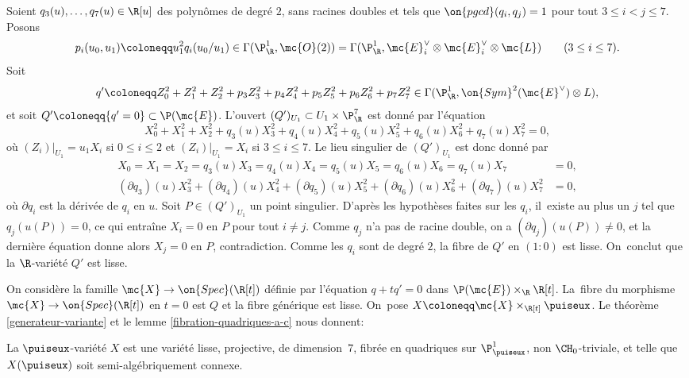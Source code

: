 Soient $q_3(u),\dots,q_7(u)\in \R[u]$ des polynômes de degré $2$, sans racines doubles et tels que $\on{pgcd}(q_i,q_j)=1$ pour tout $3\leq i<j\leq 7$. Posons
\[p_i(u_0,u_1)\coloneqq u_1^2q_i(u_0/u_1)\in \Gamma(\P^1_\R,\mc{O}(2))=\Gamma(\P^1_\R,\mc{E}_i^\vee\otimes \mc{E}_i^\vee\otimes \mc{L})\qquad (3\leq i\leq 7).\]
Soit
\[q'\coloneqq Z_0^2+Z_1^2+Z_2^2+p_3Z_3^2+p_4Z_4^2+p_5Z_5^2+p_6Z_6^2+p_7Z_7^2\in \Gamma(\P^1_\R, \on{Sym}^2(\mc{E}^\vee)\otimes L),\]
et soit $Q'\coloneqq \{q'=0\}\subset \P(\mc{E})$. L'ouvert $(Q')_{U_1}\subset U_1\times \P^7_\R$ est donné par l'équation
\[X_0^2+X_1^2+X_2^2+q_3(u)X_3^2+q_4(u)X_4^2+q_5(u)X_5^2+q_6(u)X_6^2+q_7(u)X_7^2=0,\]
où $(Z_i)|_{U_1}=u_1X_i$ si $0\leq i\leq 2$ et $(Z_i)|_{U_1}=X_i$ si $3\leq i\leq 7$.
Le lieu singulier de $(Q')_{U_1}$ est donc donné par
\begin{align*}
X_0=X_1=X_2=q_3(u)X_3=q_4(u)X_4=q_5(u)X_5=q_6(u)X_6=q_7(u)X_7&=0,\\
(\partial q_3)(u)X_3^2+(\partial q_4)(u)X_4^2+(\partial q_5)(u)X_5^2+(\partial q_6)(u)X_6^2+(\partial q_7)(u)X_7^2&=0,
\end{align*}
où $\partial q_i$ est la dérivée de $q_i$ en $u$. Soit $P\in (Q')_{U_1}$ un point singulier. D'après les hypothèses faites sur les $q_i$, il~existe au plus un $j$ tel que $q_j(u(P))=0$, ce qui entraîne $X_i=0$ en $P$ pour tout $i\neq j$. Comme $q_j$ n'a pas de racine double, on a $(\partial q_j)(u(P))\neq 0$, et la dernière équation donne alors $X_j=0$ en $P$, contradiction. Comme les $q_i$ sont de degré $2$, la fibre de $Q'$ en $(1:0)$ est lisse. On~conclut que la $\R$-variété $Q'$ est lisse.

On considère la famille $\mc{X}\to \on{Spec}(\R[t])$ définie par l'équation $q+tq'=0$ dans $\P(\mc{E})\times_\R\R[t]$. La~fibre du morphisme $\mc{X}\to \on{Spec}(\R[t])$ en $t=0$ est $Q$ et la fibre générique est lisse. On~pose $X\coloneqq \mc{X}\times_{\R[t]}\puiseux$. Le théorème \ref{generateur-variante} et le lemme \ref{fibration-quadriques-a-c} nous donnent:

\begin{thm}\label{fibres-quadriques-6}
La $\puiseux$-variété $X$ est une variété lisse, projective, de dimension~$7$, fibrée en quadriques sur $\P^1_{\puiseux}$, non $\CH_0$-triviale, et telle que $X(\puiseux)$ soit semi-algébriquement connexe.
\end{thm}

